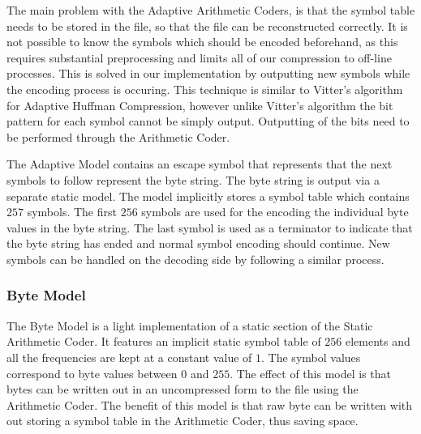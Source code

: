 \documentclass[a4paper,11pt]{report}
\begin{document}
The main problem with the Adaptive Arithmetic Coders, is that the symbol table needs to be stored in the file, so that the file can be reconstructed correctly. It is not possible to know the symbols which should be encoded beforehand, as this requires substantial preprocessing and limits all of our compression to off-line processes. This is solved in our implementation by outputting new symbols while the encoding process is occuring. This technique is similar to Vitter's algorithm for Adaptive Huffman Compression, however unlike Vitter's algorithm the bit pattern for each symbol cannot be simply output. Outputting of the bits need to be performed through the Arithmetic Coder. 

The Adaptive Model contains an escape symbol that represents that the next symbols to follow represent the byte string. The byte string is output via a separate static model. The model implicitly stores a symbol table which contains $257$ symbols. The first $256$ symbols are used for the encoding the individual byte values in the byte string. The last symbol is used as a terminator to indicate that the byte string has ended and normal symbol encoding should continue. New symbols can be handled on the decoding side by following a similar process.


\subsubsection{Byte Model}

The Byte Model is a light implementation of a static section of the Static Arithmetic Coder. It features an implicit static symbol table of $256$ elements and all the frequencies are kept at a constant value of $1$. The symbol values correspond to byte values between $0$ and $255$. The effect of this model is that bytes can be written out in an uncompressed form to the file using the Arithmetic Coder. The benefit of this model is that raw byte can be written with out storing a symbol table in the Arithmetic Coder, thus saving space. 
\end{document}

